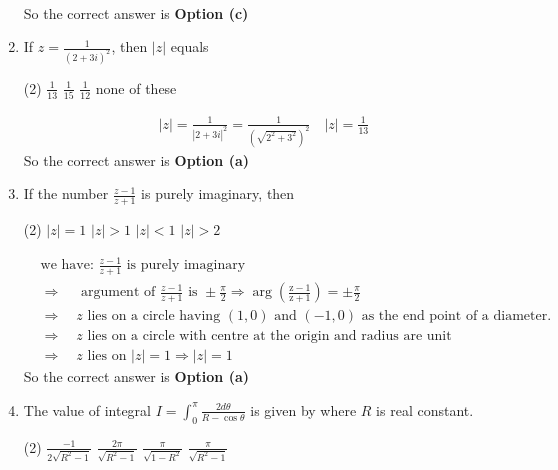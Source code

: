 \begin{enumerate}
\begin{answer}
\begin{align*}
	\end{align*}
	So the correct answer is \textbf{Option (c)}
\end{answer}
	\item If $z=\frac{1}{(2+3 i)^{2}}$, then $|z|$ equals
	\begin{tasks}(2)
		\task[\textbf{a.}]$\frac{1}{13}$
		\task[\textbf{b.}]$\frac{1}{15}$
		\task[\textbf{c.}]$\frac{1}{12}$
		\task[\textbf{d.}] none of these
	\end{tasks}
	\begin{answer}
		\begin{align*}
		|z|=\frac{1}{|2+3 i|^{2}}=\frac{1}{\left(\sqrt{2^{2}+3^{2}}\right)^{2}} \quad|z|=\frac{1}{13}
		\end{align*}
		So the correct answer is \textbf{Option (a)}
	\end{answer}
	\item If the number $\frac{z-1}{z+1}$ is purely imaginary, then
\begin{tasks}(2)
	\task[\textbf{a.}]$|z|=1$
	\task[\textbf{b.}]$|z|>1$
	\task[\textbf{c.}]$|z|<1$
	\task[\textbf{d.}] $|z|>2$
\end{tasks}
\begin{answer}
	\begin{align*}
		&\text{we have: }\frac{z-1}{z+1}\text{ is purely imaginary}\\
		&\Rightarrow \quad\text{ argument of }\frac{z-1}{z+1}\text{ is }\pm \frac{\pi}{2} \Rightarrow \arg \left(\frac{\mathrm{z}-1}{\mathrm{z}+1}\right)=\pm \frac{\pi}{2}\\
		&\Rightarrow \quad z\text{ lies on a circle having $(1,0)$ and $(-1,0)$ as the end point of a diameter.}\\
		&\Rightarrow \quad z\text{ lies on a circle with centre at the origin and radius are unit}\\
		&\Rightarrow \quad z\text{ lies on }|z|=1 \Rightarrow|z|=1
	\end{align*}
	So the correct answer is \textbf{Option (a)}
\end{answer}
\item The value of integral $I=\int_{0}^{\pi} \frac{2 d \theta}{R-\cos \theta}$ is given by where $R$ is real constant.
\begin{tasks}(2)
	\task[\textbf{a.}]$\frac{-1}{2 \sqrt{R^{2}-1}}$
	\task[\textbf{b.}]$\frac{2 \pi}{\sqrt{R^{2}-1}}$
	\task[\textbf{c.}]$\frac{\pi}{\sqrt{1-R^{2}}}$
	\task[\textbf{d.}] $\frac{\pi}{\sqrt{R^{2}-1}}$
\end{tasks}
\begin{answer}

\end{answer}
\end{enumerate}
